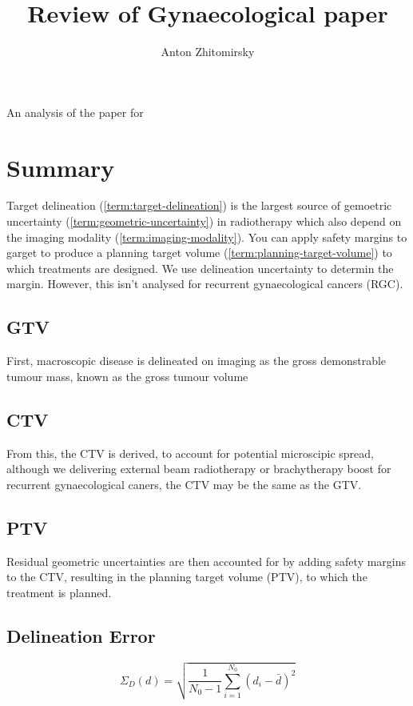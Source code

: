\documentclass[11pt]{article}
\title{Review of Gynaecological paper}
\author{Anton Zhitomirsky}
\begin{document}
\maketitle

An analysis of the paper for \cite{PTV-for-RGC-using-MRI}

\section{Summary}

Target delineation (\ref{term:target-delineation}) is the largest source of gemoetric uncertainty (\ref{term:geometric-uncertainty}) in radiotherapy which also depend on the imaging modality (\ref{term:imaging-modality}). You can apply safety margins to garget to produce a planning target volume (\ref{term:planning-target-volume}) to which treatments are designed. We use delineation uncertainty to determin the margin. However, this isn't analysed for recurrent gynaecological cancers (RGC).

\subsection{GTV}

First, macroscopic disease is delineated on imaging as the gross demonstrable tumour mass, known as the gross tumour volume

\subsection{CTV}

From this, the CTV is derived, to account for potential microscipic spread, although we delivering external beam radiotherapy or brachytherapy boost for recurrent gynaecological caners, the CTV may be the same as the GTV.

\subsection{PTV}

Residual geometric uncertainties are then accounted for by
adding safety margins to the CTV, resulting in the planning
target volume (PTV), to which the treatment is planned.

\subsection{Delineation Error}

\begin{equation}
    \Sigma_D(d) = \sqrt{\frac{1}{N_0-1}\sum^{N_0}_{i=1}{(d_i - \bar d)^2}} \label{equ:delineation-error}
\end{equation}
\end{document}
